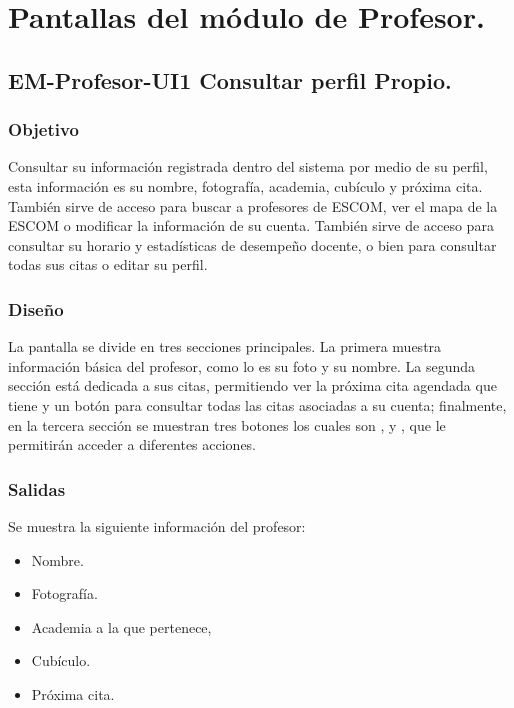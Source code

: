 

\section{Pantallas del módulo de Profesor.}

\subsection{EM-Profesor-UI1 Consultar perfil Propio.}

\subsubsection{Objetivo}
	\noindent
	Consultar su información registrada dentro del sistema por medio de su perfil, esta información es su nombre, fotografía, academia, cubículo y próxima cita. También sirve de acceso para buscar a profesores de ESCOM, ver el mapa de la ESCOM o modificar la información de su cuenta. También sirve de acceso para consultar su horario y estadísticas de desempeño docente, o bien para consultar todas sus citas o editar su perfil.  

\subsubsection{Diseño}
	\noindent
	La pantalla se divide en tres secciones principales. La primera muestra información básica del profesor, como lo es su foto y su nombre. La segunda sección está dedicada a sus citas, permitiendo ver la próxima cita agendada que tiene y un botón para consultar todas las citas asociadas a su cuenta; finalmente, en la tercera sección se muestran tres botones los cuales son ,  y , que le permitirán acceder a diferentes acciones. 
 
\pagebreak
{}

\subsubsection{Salidas}
	Se muestra la siguiente información del profesor:
	\begin{itemize}
		\item Nombre.
		\item Fotografía.
		\item Academia a la que pertenece,
		\item Cubículo.
		\item Próxima cita.
	\end{itemize}

